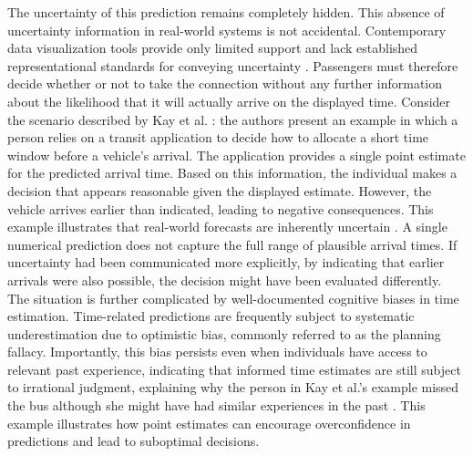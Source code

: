 \documentclass[final,journal,a4paper]{IEEEtran}
\begin{document}
The uncertainty of this prediction remains completely hidden. This absence of uncertainty information in real-world systems is not accidental. Contemporary data visualization tools provide only limited support and lack established representational standards for conveying uncertainty \cite{Brennen2018}. Passengers must therefore decide whether or not to take the connection without any further information about the likelihood that it will actually arrive on the displayed time. Consider the scenario described by Kay et al. \cite{Kay2016}: the authors present an example in which a person relies on a transit application to decide how to allocate a short time window before a vehicle’s arrival. The application provides a single point estimate for the predicted arrival time. Based on this information, the individual makes a decision that appears reasonable given the displayed estimate. However, the vehicle arrives earlier than indicated, leading to negative consequences. This example illustrates that real-world forecasts are inherently uncertain \cite{Kay2016}. A single numerical prediction does not capture the full range of plausible arrival times. If uncertainty had been communicated more explicitly, by indicating that earlier arrivals were also possible, the decision might have been evaluated differently. The situation is further complicated by well-documented cognitive biases in time estimation. Time-related predictions are frequently subject to systematic underestimation due to optimistic bias, commonly referred to as the planning fallacy. Importantly, this bias persists even when individuals have access to relevant past experience, indicating that informed time estimates are still subject to irrational judgment, explaining why the person in Kay et al.'s \cite{Kay2016} example missed the bus although she might have had similar experiences in the past \cite{Koval2022}. This example illustrates how point estimates can encourage overconfidence in predictions and lead to suboptimal decisions. 
\newline
\end{document}

